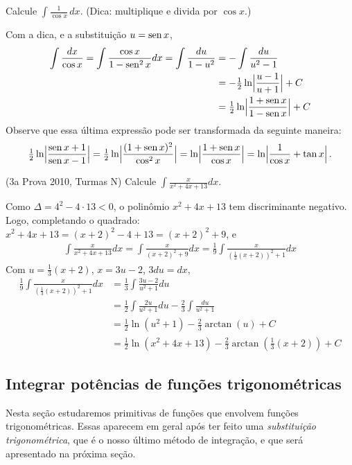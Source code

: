 \begin{exo}\label{exo:primunsurseno}
Calcule $\int \frac{1}{\cos x}\,dx$. (Dica: multiplique e divida por $\cos x$.)
\begin{sol}
Com a dica, e a substituição $u=\operatorname{sen} x$,
\begin{align*}
\int \frac{dx}{\cos x}=\int\frac{\cos x}{1-\operatorname{sen}^2
x}dx=\int\frac{du}{1-u^2}&=-\int\frac{du}{u^2-1}\\
&=-\tfrac{1}{2}\ln\Bigl|\frac{u-1}{u+1}\Bigr|+C\\
&=\tfrac{1}{2}\ln\Bigl|\frac{1+\operatorname{sen} x}{1-\operatorname{sen} x}\Bigr|+C
\end{align*}
Observe que essa última expressão pode ser transformada da seguinte maneira:
\begin{align*}
\tfrac{1}{2}\ln\Bigl|\frac{\operatorname{sen} x+1}{\operatorname{sen} x-1}\Bigr|=
\tfrac{1}{2}\ln\Bigl|\frac{(1+\operatorname{sen} x)^2}{\cos^2x}\Bigr|=
\ln\Bigl|\frac{1+\operatorname{sen} x}{\cos x}\Bigr|=
\ln\Bigl|\frac{1}{\cos x}+\tan x\Bigr|\,.
\end{align*}
\end{sol}
\end{exo}

\begin{exo} (3a Prova 2010, Turmas N) Calcule  $\int\frac{x}{x^2+4x+13}dx$.
\begin{sol}
Como $\Delta=4^2-4\cdot 13<0$, o polinômio $x^2+4x+13$ tem discriminante
negativo. Logo, completando o quadrado:
$x^2+4x+13=(x+2)^2-4+13=(x+2)^2+9$, e
\begin{align*}
\int \frac{x}{x^2+4x+13}dx=\int
\frac{x}{(x+2)^2+9}dx=\tfrac19\int\frac{x}{(\tfrac13(x+2))^2+1}dx
\end{align*}
Com $u=\frac{1}{3}(x+2)$, $x=3u-2$, $3du=dx$,
\begin{align*}
 \tfrac19\int\frac{x}{(\tfrac13(x+2))^2+1}dx&=\tfrac13\int\frac{3u-2}{u^2+1}du\\
&=\tfrac12\int\frac{2u}{u^2+1}du-\tfrac23\int\frac{du}{u^2+1}\\
&=\tfrac12\ln (u^2+1)-\tfrac23 \arctan(u)+C\\
&=\tfrac12\ln (x^2+4x+13)-\tfrac23\arctan(\frac{1}{3}(x+2))+C
\end{align*}
\end{sol}
\end{exo}


\subsection{Integrar potências de funções trigonométricas}
Nesta seção estudaremos primitivas de funções que envolvem 
funções trigonométricas. Essas
aparecem em geral após ter feito uma \emph{substituição
trigonométrica}, que é o nosso último método de integração, e que será
apresentado na próxima seção.

